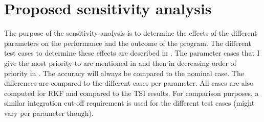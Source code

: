 \chapter{Proposed sensitivity analysis} 				
\label{app:appendixE-proposedSensitivityAnalysis}

The purpose of the sensitivity analysis is to determine the effects of the different parameters on the performance and the outcome of the program. The different test cases to determine these effects are described in . The parameter cases that I give the most priority to are mentioned in  and then in decreasing order of priority in . The accuracy will always be compared to the nominal case. The differences are compared to the different cases per parameter. All cases are also computed for \ac{RKF} and compared to the \ac{TSI} results. For comparison purposes, a similar integration cut-off requirement is used for the different test cases (might vary per parameter though).

